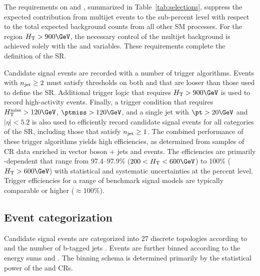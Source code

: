 The requirements on \alphat and \bdphi, summarized in
Table~\ref{tab:selections}, suppress the expected contribution from
multijet events to the sub-percent level with respect to the total
expected background counts from all other SM processes. 
For the region $\scalht > 900\GeV$, the necessary control of the
multijet background is achieved solely with the \bdphi and \bdphimod
variables. These requirements complete the definition of the SR.

Candidate signal events are recorded with a number of trigger
algorithms. Events with $n_{\text{jet}} \geq 2$ must satisfy thresholds on both
\scalht and \alphat that are looser than those used to define the
SR. Additional trigger logic that requires $\scalht > 900\GeV$ is used
to record high-activity events. Finally, a trigger condition that
requires $\mht > 120\GeV$, $\ptmiss > 120\GeV$, and a single jet with
$\pt > 20\GeV$ and $|\eta| < 5.2$ is also used to efficiently record
candidate signal events for all categories of the SR, including those
that satisfy $n_{\text{jet}} \geq 1$. The combined performance of these trigger
algorithms yields high efficiencies, as determined from samples of CR
data enriched in vector boson + jets and \ttbar events. The
efficiencies are primarily \scalht-dependent that range from
97.4--97.9\% ($200 < \scalht < 600\GeV$) to 100\% ($\scalht >
600\GeV$) with statistical and systematic uncertainties at the percent
level. Trigger efficiencies for a range of benchmark signal models are
typically comparable or higher (${\approx}100\%$).


\subsection{Event categorization}
\label{sec:categorization}

Candidate signal events are categorized into 27 discrete topologies
according to \njet and the number of b-tagged jets \nb. Events are
further binned according to the energy sums \scalht and \mht. The
binning schema is determined primarily by the statistical power of the
\mj and \mmj CRs. 

